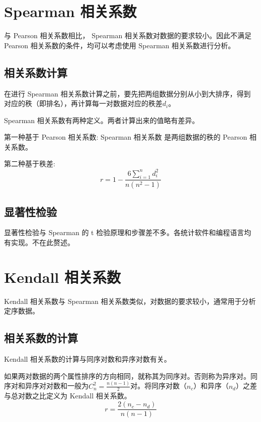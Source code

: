 \documentclass[withoutpreface]{cumcmthesis}
\begin{document}
\section{Spearman 相关系数}

与 Pearson 相关系数相比， Spearman 相关系数对数据的要求较小。因此不满足 Pearson 相关系数的条件，均可以考虑使用 Spearman 相关系数进行分析。

\subsection{相关系数计算}

在进行 Spearman 相关系数计算之前，要先把两组数据分别从小到大排序，得到对应的秩（即排名），再计算每一对数据对应的秩差$d_i$。

Spearman 相关系数有两种定义。两者计算出来的值略有差异。

第一种基于 Pearson 相关系数: Spearman 相关系数 是两组数据的秩的 Pearson 相关系数。

第二种基于秩差:
\begin{equation}
    r = 1-\frac{6 \sum\limits_{i=1}^{n} d_i^2}{n(n^2-1)}
\end{equation}

\subsection{显著性检验}

显著性检验与 Spearman 的 t 检验原理和步骤差不多。各统计软件和编程语言均有实现。不在此赘述。

\section{Kendall 相关系数}

Kendall 相关系数与 Spearman 相关系数类似，对数据的要求较小，通常用于分析定序数据。

\subsection{相关系数的计算}

Kendall 相关系数的计算与同序对数和异序对数有关。

如果两对数据的两个属性排序的方向相同，就称其为同序对。否则称为异序对。同序对和异序对对数和一般为$C_n^2=\frac{n(n-1)}{2}$对。将同序对数（$n_c$）和异序（$n_d$）之差与总对数之比定义为 Kendall 相关系数。
\begin{equation}
    r = \frac{2(n_c-n_d)}{n(n-1)}
\end{equation}
\end{document}
